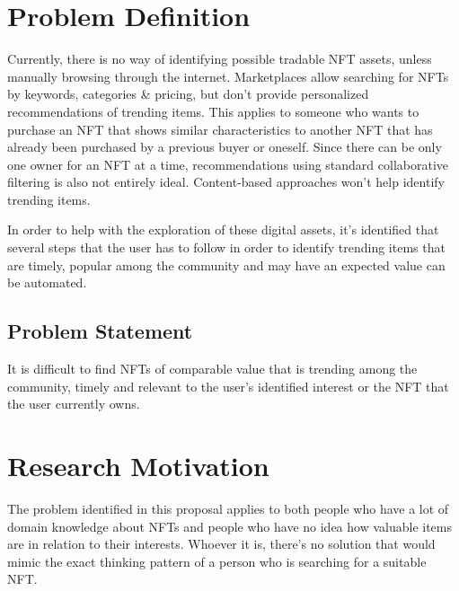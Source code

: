 \documentclass[a4paper, 12pt, oneside]{report}
\begin{document}





\chapter{Problem Definition}
Currently, there is no way of identifying possible tradable NFT assets, unless manually browsing through the internet. 
Marketplaces allow searching for NFTs by keywords, categories \& pricing, but don't provide personalized recommendations of trending items.
This applies to someone who wants to purchase an NFT that shows similar characteristics to another NFT that has already been purchased by a previous buyer or oneself. Since there can be only one owner for an NFT at a time, recommendations using standard collaborative filtering is also not entirely ideal. Content-based approaches won't help identify trending items.

\bigbreak
In order to help with the exploration of these digital assets, it's identified that several steps that the user has to follow in order to identify trending items that are timely, popular among the community and may have an expected value can be automated. 

\section{Problem Statement}
It is difficult to find NFTs of comparable value that is trending among the community, timely and relevant to the user’s identified interest or the NFT that the user currently owns.

\chapter{Research Motivation}
The problem identified in this proposal applies to both people who have a lot of domain knowledge about NFTs and people who have no idea how valuable items are in relation to their interests. Whoever it is, there's no solution that would mimic the exact thinking pattern of a person who is searching for a suitable NFT.
\end{document}
